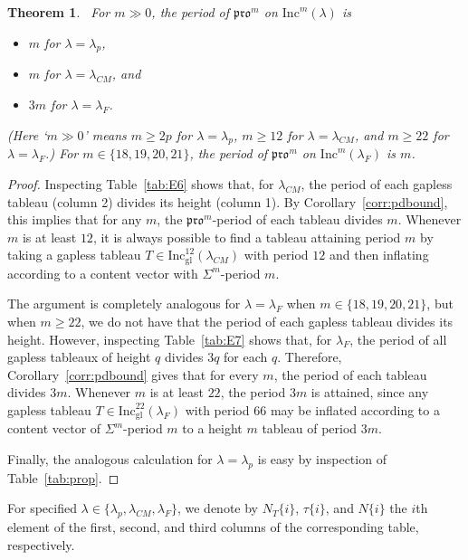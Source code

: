 \documentclass[12pt]{amsart}
\newtheorem{theorem}{Theorem}[section]
\theoremstyle{definition}
\theoremstyle{remark}
\numberwithin{equation}{section}
\newcommand{\inc}{\ensuremath{\mathrm{Inc}}}
\newcommand{\incgl}{\inc_{\mathrm{gl}}}
\newcommand{\pro}{\mathfrak{pro}}
\begin{document}
\begin{theorem}~\label{thm:actualpdbound}
For $m \gg 0$, the period of $\pro^m$ on $\inc^m(\lambda)$ is 
\begin{itemize}
\item $m$ for $\lambda = \lambda_p$, 
\item $m$ for $\lambda = \lambda_{CM}$, and 
\item $3m$ for $\lambda = \lambda_F$. 
\end{itemize}
(Here `$m \gg 0$' means $m \geq 2p$ for $\lambda = \lambda_p$, $m \geq 12$ for $\lambda = \lambda_{CM}$, and $m \geq 22$ for $\lambda = \lambda_F$.) For $m \in \lbrace 18,19,20, 21 \rbrace$, the period of $\pro^m$ on $\inc^m(\lambda_F)$ is $m$.
\end{theorem}
\begin{proof}
Inspecting Table~\ref{tab:E6} shows that, for $\lambda_{CM}$, the period of each gapless tableau (column 2) divides its height (column 1). By Corollary~\ref{corr:pdbound}, this implies that for any $m$, the $\pro^m$-period of each tableau divides $m$.
Whenever $m$ is at least $12$,  
it is always possible to find a tableau attaining period $m$ by taking a gapless tableau $T \in \incgl^{12}(\lambda_{CM})$ with period $12$ and then inflating according to a content vector with $\Sigma^m$-period $m$.

The argument is completely analogous for $\lambda = \lambda_F$ when $m \in \lbrace 18,19,20, 21 \rbrace$, but when $m \geq 22$, we do not have that the period of each gapless tableau divides its height. However, inspecting Table~\ref{tab:E7} shows that, for $\lambda_F$, the period of all gapless tableaux of height $q$ divides $3q$ for each $q$. Therefore, Corollary~\ref{corr:pdbound} gives that for every $m$, the period of each tableau divides $3m$. Whenever $m$ is at least $22$, the period $3m$ is attained, since any gapless tableau  $T \in \incgl^{22}(\lambda_F)$ with period $66$ may be inflated according to a content vector of $\Sigma^m$-period $m$ to a height $m$ tableau of period $3m$. 

Finally, the analogous calculation for $\lambda = \lambda_p$ is easy by inspection of Table~\ref{tab:prop}.
\end{proof}


For specified $\lambda \in \{\lambda_p, \lambda_{CM}, \lambda_F\}$, we denote by $N_T\{i\}$, $\tau\{i\}$, and $N\{i\}$ the $i$th element of the first, second, and third columns of the corresponding table, respectively. 
\-\ \\ \-\
\end{document}
